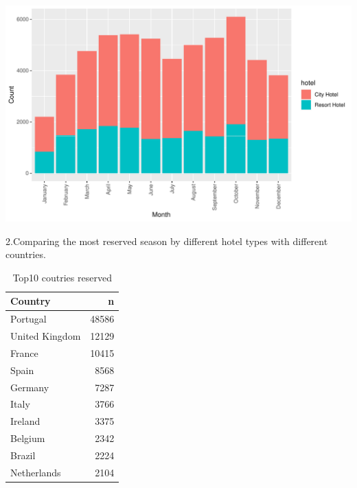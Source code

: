 \documentclass[11pt,a4paper,]{article}
\newenvironment{Shaded}{\begin{snugshade}}{\end{snugshade}}
\newcommand{\DataTypeTok}[1]{\textcolor[rgb]{0.13,0.29,0.53}{#1}}
\newcommand{\DecValTok}[1]{\textcolor[rgb]{0.00,0.00,0.81}{#1}}
\newcommand{\KeywordTok}[1]{\textcolor[rgb]{0.13,0.29,0.53}{\textbf{#1}}}
\newcommand{\NormalTok}[1]{#1}
\newcommand{\OperatorTok}[1]{\textcolor[rgb]{0.81,0.36,0.00}{\textbf{#1}}}
\newcommand{\StringTok}[1]{\textcolor[rgb]{0.31,0.60,0.02}{#1}}
\begin{document}
\includegraphics{tidy_files/figure-latex/unnamed-chunk-13-1.pdf}

2.Comparing the most reserved season by different hotel types with different countries.

\begin{Shaded}
\end{Shaded}

\begin{table}

\caption{\label{tab:unnamed-chunk-14}Top10 coutries reserved}
\centering
\begin{tabular}[t]{l|r}
\hline
Country & n\\
\hline
Portugal & 48586\\
\hline
United Kingdom & 12129\\
\hline
France & 10415\\
\hline
Spain & 8568\\
\hline
Germany & 7287\\
\hline
Italy & 3766\\
\hline
Ireland & 3375\\
\hline
Belgium & 2342\\
\hline
Brazil & 2224\\
\hline
Netherlands & 2104\\
\hline
\end{tabular}
\end{table}
\end{document}

